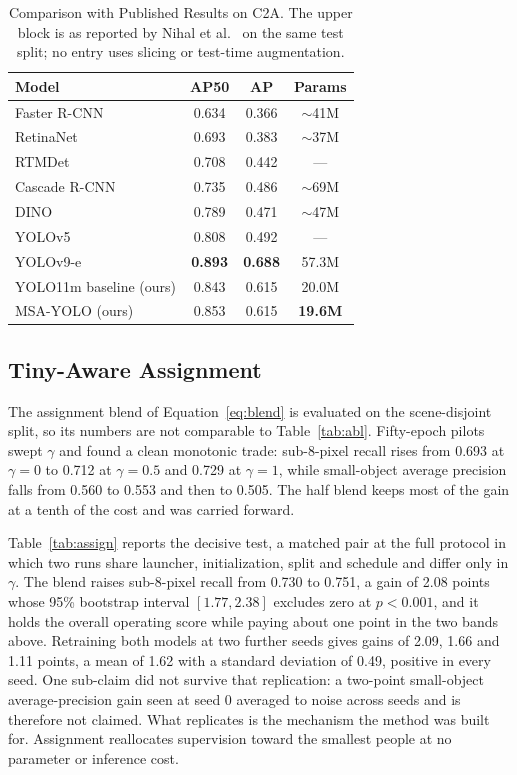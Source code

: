 \documentclass[conference,a4paper]{IEEEtran}
\begin{document}
\begin{table}[htbp]
\caption{Comparison with Published Results on C2A. The upper block is as
reported by Nihal et al.~\cite{nihal2024c2a} on the same test split; no entry
uses slicing or test-time augmentation.}
\label{tab:sota}
\begin{center}
\small
\begin{tabular}{|l|c|c|c|}
\hline
\textbf{Model} & \textbf{AP50} & \textbf{AP} & \textbf{Params} \\
\hline
Faster R-CNN & 0.634 & 0.366 & $\sim$41M \\
\hline
RetinaNet & 0.693 & 0.383 & $\sim$37M \\
\hline
RTMDet & 0.708 & 0.442 & --- \\
\hline
Cascade R-CNN & 0.735 & 0.486 & $\sim$69M \\
\hline
DINO & 0.789 & 0.471 & $\sim$47M \\
\hline
YOLOv5 & 0.808 & 0.492 & --- \\
\hline
YOLOv9-e & \textbf{0.893} & \textbf{0.688} & 57.3M \\
\hline
YOLO11m baseline (ours) & 0.843 & 0.615 & 20.0M \\
\hline
MSA-YOLO (ours) & 0.853 & 0.615 & \textbf{19.6M} \\
\hline
\end{tabular}
\end{center}
\end{table}

\subsection{Tiny-Aware Assignment}
The assignment blend of Equation~\eqref{eq:blend} is evaluated on the
scene-disjoint split, so its numbers are not comparable to
Table~\ref{tab:abl}. Fifty-epoch pilots swept $\gamma$ and found a clean
monotonic trade: sub-8-pixel recall rises from 0.693 at $\gamma = 0$ to 0.712 at
$\gamma = 0.5$ and 0.729 at $\gamma = 1$, while small-object average precision
falls from 0.560 to 0.553 and then to 0.505. The half blend keeps most of the
gain at a tenth of the cost and was carried forward.

Table~\ref{tab:assign} reports the decisive test, a matched pair at the full
protocol in which two runs share launcher, initialization, split and schedule
and differ only in $\gamma$. The blend raises sub-8-pixel recall from 0.730 to
0.751, a gain of 2.08 points whose 95\% bootstrap interval $[1.77, 2.38]$
excludes zero at $p < 0.001$, and it holds the overall operating score while
paying about one point in the two bands above. Retraining both models at two
further seeds gives gains of 2.09, 1.66 and 1.11 points, a mean of 1.62 with a
standard deviation of 0.49, positive in every seed. One sub-claim did not
survive that replication: a two-point small-object average-precision gain seen
at seed 0 averaged to noise across seeds and is therefore not claimed. What
replicates is the mechanism the method was built for. Assignment reallocates
supervision toward the smallest people at no parameter or inference cost.
\end{document}
